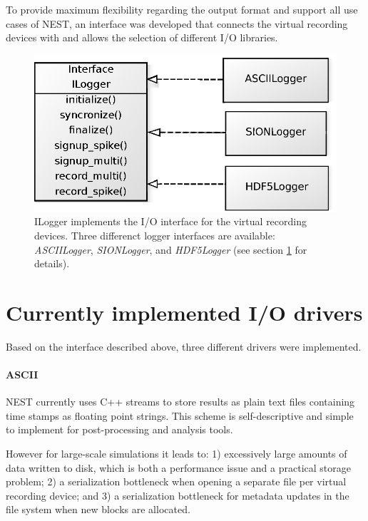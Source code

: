 \documentclass[]{YIC2015}
\begin{document}
To provide maximum flexibility regarding the output format and support
all use cases of NEST, an interface was developed that connects the
virtual recording devices with and allows the selection of different
I/O libraries.

\begin{figure}[htbp]
\centering %
\includegraphics[scale=0.5]{loggerinterface.eps}
\caption{ILogger implements the I/O interface for the virtual
  recording devices.  Three differenct logger interfaces are
  available: \emph{ASCIILogger}, \emph{SIONLogger}, and
  \emph{HDF5Logger} (see section \ref{sec:io-drivers} for details).}
\label{fig:loggerinterface}
\end{figure}

\section{Currently implemented I/O drivers}
\label{sec:io-drivers}

Based on the interface described above, three different drivers were
implemented.

\paragraph{ASCII}

NEST currently uses C++ streams to store results as plain text files
containing time stamps as floating point strings. This scheme is
self-descriptive and simple to implement for post-processing and
analysis tools.

However for large-scale simulations it leads to: 1) excessively large
amounts of data written to disk, which is both a performance issue and
a practical storage problem; 2) a serialization bottleneck when
opening a separate file per virtual recording device; and 3) a
serialization bottleneck for metadata updates in the file system when
new blocks are allocated.
\end{document}
